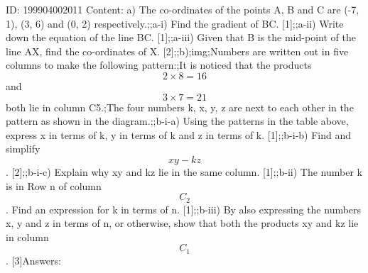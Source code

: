 \documentclass{article}
\begin{document}
ID: 199904002011
Content:
a) The co-ordinates of the points A, B and C are (-7, 1), (3, 6) and (0, 2) respectively.;;a-i) Find the gradient of BC. [1];;a-ii) Write down the equation of the line BC. [1];;a-iii) Given that B is the mid-point of the line AX, find the co-ordinates of X. [2];;b);img;Numbers are written out in five columns to make the following pattern:;It is noticed that the products $$2 \times 8 =16$$ and $$3 \times 7 =21$$ both lie in column C5.;The four numbers k, x, y, z are next to each other in the pattern as shown in the diagram.;;b-i-a) Using the patterns in the table above, express x in terms of k, y in terms of k and z in terms of k. [1];;b-i-b) Find and simplify $$xy - kz$$. [2];;b-i-c) Explain why xy and kz lie in the same column. [1];;b-ii) The number k is in Row n of column $$C_2$$. Find an expression for k in terms of n. [1];;b-iii) By also expressing the numbers x, y and z in terms of n, or otherwise, show that both the products xy and kz lie in column $$C_1$$. [3]Answers:
\end{document}
